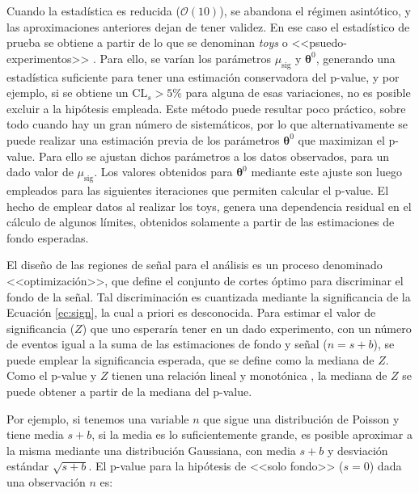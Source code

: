 Cuando la estadística es reducida ($\mathcal{O}(10)$), se abandona el régimen asintótico, y las aproximaciones anteriores dejan de tener validez. En ese caso el estadístico de prueba se obtiene a partir de lo que se denominan \textit{toys} o <<psuedo-experimentos>> \cite{Baak:2014wma}. Para ello, se varían los parámetros $\mu_\text{sig}$ y $\bm{\theta}^0$, generando una estadística suficiente para tener una estimación conservadora del p-value, y por ejemplo, si se obtiene un $\text{CL}_{s}>5\%$ para alguna de esas variaciones, no es posible excluir a la hipótesis empleada. Este método puede resultar poco práctico, sobre todo cuando hay un gran número de sistemáticos, por lo que alternativamente se puede realizar una estimación previa de los parámetros $\bm{\theta}^0$ que maximizan el p-value. Para ello se ajustan dichos parámetros a los datos observados, para un dado valor de $\mu_\text{sig}$. Los valores obtenidos para $\bm{\theta}^0$ mediante este ajuste son luego empleados para las siguientes iteraciones que permiten calcular el p-value. El hecho de emplear datos al realizar los toys, genera una dependencia residual en el cálculo de algunos límites, obtenidos solamente a partir de las estimaciones de fondo esperadas.
 




 



El diseño de las regiones de señal para el análisis es un proceso denominado <<optimización>>, que define el conjunto de cortes óptimo para discriminar el fondo de la señal. Tal discriminación es cuantizada mediante la significancia de la Ecuación \ref{ec:sign}, la cual a priori es desconocida. Para estimar el valor de significancia ($Z$) que uno esperaría tener en un dado experimento, con un número de eventos igual a la suma de las estimaciones de fondo y señal ($n=s+b$), se puede emplear la significancia esperada, que se define como la mediana de $Z$. Como el p-value y $Z$ tienen una relación lineal y monotónica \cite{Cowan:2010js}, la mediana de $Z$ se puede obtener a partir de la mediana del p-value.


Por ejemplo, si tenemos una variable $n$ que sigue una distribución de Poisson y tiene media $s+b$, si la media es lo suficientemente grande, es posible aproximar a la misma mediante una distribución Gaussiana, con media $s+b$ y desviación estándar $\sqrt{s+b}$. El p-value para la hipótesis de <<solo fondo>> ($s=0$) dada una observación $n$ es:



